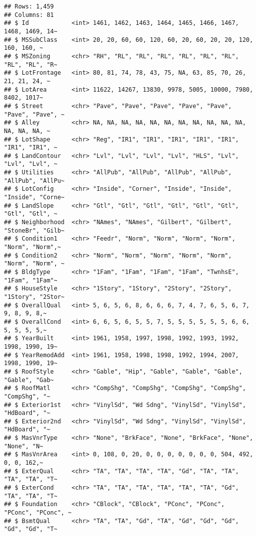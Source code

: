 \documentclass[
]{article}
\begin{document}
\begin{verbatim}
## Rows: 1,459
## Columns: 81
## $ Id            <int> 1461, 1462, 1463, 1464, 1465, 1466, 1467, 1468, 1469, 14~
## $ MSSubClass    <int> 20, 20, 60, 60, 120, 60, 20, 60, 20, 20, 120, 160, 160, ~
## $ MSZoning      <chr> "RH", "RL", "RL", "RL", "RL", "RL", "RL", "RL", "RL", "R~
## $ LotFrontage   <int> 80, 81, 74, 78, 43, 75, NA, 63, 85, 70, 26, 21, 21, 24, ~
## $ LotArea       <int> 11622, 14267, 13830, 9978, 5005, 10000, 7980, 8402, 1017~
## $ Street        <chr> "Pave", "Pave", "Pave", "Pave", "Pave", "Pave", "Pave", ~
## $ Alley         <chr> NA, NA, NA, NA, NA, NA, NA, NA, NA, NA, NA, NA, NA, NA, ~
## $ LotShape      <chr> "Reg", "IR1", "IR1", "IR1", "IR1", "IR1", "IR1", "IR1", ~
## $ LandContour   <chr> "Lvl", "Lvl", "Lvl", "Lvl", "HLS", "Lvl", "Lvl", "Lvl", ~
## $ Utilities     <chr> "AllPub", "AllPub", "AllPub", "AllPub", "AllPub", "AllPu~
## $ LotConfig     <chr> "Inside", "Corner", "Inside", "Inside", "Inside", "Corne~
## $ LandSlope     <chr> "Gtl", "Gtl", "Gtl", "Gtl", "Gtl", "Gtl", "Gtl", "Gtl", ~
## $ Neighborhood  <chr> "NAmes", "NAmes", "Gilbert", "Gilbert", "StoneBr", "Gilb~
## $ Condition1    <chr> "Feedr", "Norm", "Norm", "Norm", "Norm", "Norm", "Norm",~
## $ Condition2    <chr> "Norm", "Norm", "Norm", "Norm", "Norm", "Norm", "Norm", ~
## $ BldgType      <chr> "1Fam", "1Fam", "1Fam", "1Fam", "TwnhsE", "1Fam", "1Fam"~
## $ HouseStyle    <chr> "1Story", "1Story", "2Story", "2Story", "1Story", "2Stor~
## $ OverallQual   <int> 5, 6, 5, 6, 8, 6, 6, 6, 7, 4, 7, 6, 5, 6, 7, 9, 8, 9, 8,~
## $ OverallCond   <int> 6, 6, 5, 6, 5, 5, 7, 5, 5, 5, 5, 5, 5, 6, 6, 5, 5, 5, 5,~
## $ YearBuilt     <int> 1961, 1958, 1997, 1998, 1992, 1993, 1992, 1998, 1990, 19~
## $ YearRemodAdd  <int> 1961, 1958, 1998, 1998, 1992, 1994, 2007, 1998, 1990, 19~
## $ RoofStyle     <chr> "Gable", "Hip", "Gable", "Gable", "Gable", "Gable", "Gab~
## $ RoofMatl      <chr> "CompShg", "CompShg", "CompShg", "CompShg", "CompShg", "~
## $ Exterior1st   <chr> "VinylSd", "Wd Sdng", "VinylSd", "VinylSd", "HdBoard", "~
## $ Exterior2nd   <chr> "VinylSd", "Wd Sdng", "VinylSd", "VinylSd", "HdBoard", "~
## $ MasVnrType    <chr> "None", "BrkFace", "None", "BrkFace", "None", "None", "N~
## $ MasVnrArea    <int> 0, 108, 0, 20, 0, 0, 0, 0, 0, 0, 0, 504, 492, 0, 0, 162,~
## $ ExterQual     <chr> "TA", "TA", "TA", "TA", "Gd", "TA", "TA", "TA", "TA", "T~
## $ ExterCond     <chr> "TA", "TA", "TA", "TA", "TA", "TA", "Gd", "TA", "TA", "T~
## $ Foundation    <chr> "CBlock", "CBlock", "PConc", "PConc", "PConc", "PConc", ~
## $ BsmtQual      <chr> "TA", "TA", "Gd", "TA", "Gd", "Gd", "Gd", "Gd", "Gd", "T~

\end{verbatim}
\end{document}
